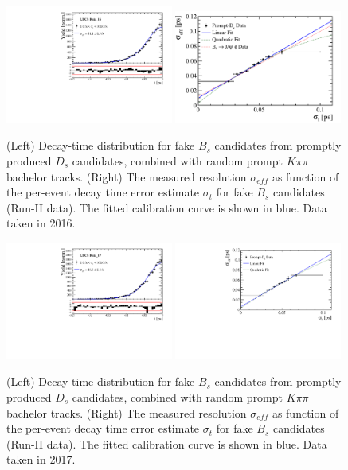 \begin{figure}[h]
\centering
\includegraphics[height=!,width=0.49\textwidth]{figs/Resolution/SignalData_16_bin_all.pdf}
\includegraphics[height=!,width=0.49\textwidth]{figs/Resolution/ScaleFactor_Data_16.pdf}
\caption{ (Left) Decay-time distribution for fake $B_s$ candidates from promptly produced $D_s$ candidates, combined with random prompt $K\pi\pi$ bachelor tracks.
(Right) The measured resolution $\sigma_{eff}$ as function of the per-event decay time error estimate $\sigma_t$ for fake $B_s$ candidates (Run-II data).
The fitted calibration curve is shown in blue. Data taken in 2016.}
\label{fig:scaleFactorData_16}
\end{figure}

\begin{figure}[h]
\centering
\includegraphics[height=!,width=0.49\textwidth]{figs/Resolution/SignalData_17_bin_all.pdf}
\includegraphics[height=!,width=0.49\textwidth]{figs/Resolution/ScaleFactor_Data_17.pdf}
\caption{ (Left) Decay-time distribution for fake $B_s$ candidates from promptly produced $D_s$ candidates, combined with random prompt $K\pi\pi$ bachelor tracks.
(Right) The measured resolution $\sigma_{eff}$ as function of the per-event decay time error estimate $\sigma_t$ for fake $B_s$ candidates (Run-II data).
The fitted calibration curve is shown in blue. Data taken in 2017.}
\label{fig:scaleFactorData_17}
\end{figure}


